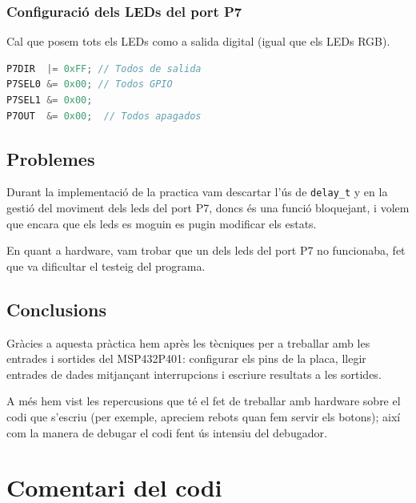 \documentclass[12pt,a4paper]{article}
\begin{document}
\subsubsection{Configuració dels LEDs del port P7}

Cal que posem tots els LEDs como a salida digital (igual que els LEDs RGB).

\begin{lstlisting}[language=C]
P7DIR  |= 0xFF; // Todos de salida
P7SEL0 &= 0x00; // Todos GPIO
P7SEL1 &= 0x00;
P7OUT  &= 0x00;  // Todos apagados
\end{lstlisting}



\subsection{Problemes}
Durant la implementació de la practica vam descartar l'ús de \texttt{delay\_t} y en la gestió del moviment dels leds del port P7, doncs és una funció bloquejant, i volem que encara que els leds es moguin es pugin modificar els estats.

En quant a hardware, vam trobar que un dels leds del port P7 no funcionaba, fet que va dificultar el testeig del programa.

\subsection{Conclusions}

Gràcies a aquesta pràctica hem après les tècniques per a treballar amb les entrades i sortides del MSP432P401: configurar els pins de la placa, llegir entrades de dades mitjançant interrupcions i escriure resultats a les sortides.

A més hem vist les repercusions que té el fet de treballar amb hardware sobre el codi que s'escriu (per exemple, apreciem rebots quan fem servir els botons); així com la manera de debugar el codi fent ús intensiu del debugador.

\section{Comentari del codi}
\end{document}
